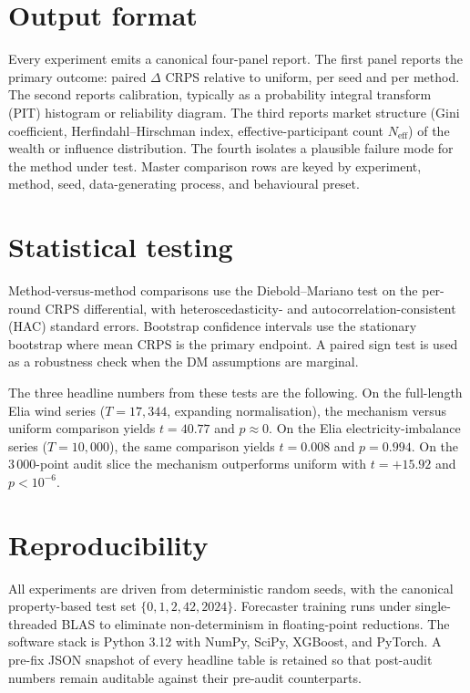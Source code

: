 \documentclass[
  11pt,
  a4paper,
  oneside]{report}
\begin{document}
\section{Output format}\label{output-format}

Every experiment emits a canonical four-panel report. The first panel
reports the primary outcome: paired \(\Delta\) CRPS relative to uniform,
per seed and per method. The second reports calibration, typically as a
probability integral transform (PIT) histogram or reliability diagram.
The third reports market structure (Gini coefficient,
Herfindahl--Hirschman index, effective-participant count
\(N_\mathrm{eff}\)) of the wealth or influence distribution. The fourth
isolates a plausible failure mode for the method under test. Master
comparison rows are keyed by experiment, method, seed, data-generating
process, and behavioural preset.

\section{Statistical testing}\label{statistical-testing}

Method-versus-method comparisons use the Diebold--Mariano test
\citep{diebold1995comparing} on the per-round CRPS differential, with
heteroscedasticity- and autocorrelation-consistent (HAC) standard
errors. Bootstrap confidence intervals use the stationary bootstrap
where mean CRPS is the primary endpoint. A paired sign test is used as a
robustness check when the DM assumptions are marginal.

The three headline numbers from these tests are the following. On the
full-length Elia wind series (\(T = 17{,}344\), expanding
normalisation), the mechanism versus uniform comparison yields
\(t = 40.77\) and \(p \approx 0\). On the Elia electricity-imbalance
series (\(T = 10{,}000\)), the same comparison yields \(t = 0.008\) and
\(p = 0.994\). On the \(3\,000\)-point audit slice the mechanism
outperforms uniform with \(t = +15.92\) and \(p < 10^{-6}\).

\section{Reproducibility}\label{reproducibility}

All experiments are driven from deterministic random seeds, with the
canonical property-based test set \(\{0, 1, 2, 42, 2024\}\). Forecaster
training runs under single-threaded BLAS to eliminate non-determinism in
floating-point reductions. The software stack is Python 3.12 with NumPy,
SciPy, XGBoost, and PyTorch. A pre-fix JSON snapshot of every headline
table is retained so that post-audit numbers remain auditable against
their pre-audit counterparts.
\end{document}
